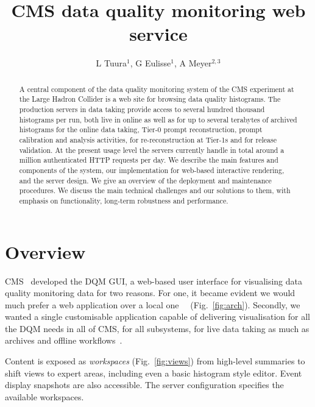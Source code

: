 \documentclass[a4paper]{jpconf}
\begin{document}
\title{CMS data quality monitoring web service}
\author{L Tuura$^1$, G Eulisse$^1$, A Meyer$^{2,3}$}
\address{$^1$ Northeastern University, Boston, MA, USA}
\address{$^2$ DESY, Hamburg, Germany}
\address{$^3$ CERN, Geneva, Switzerland}

\begin{abstract}
A central component of the data quality monitoring system of the CMS
experiment at the Large Hadron Collider is a web site for browsing
data quality histograms.  The production servers in data taking
provide access to several hundred thousand histograms per run, both
live in online as well as for up to several terabytes of archived
histograms for the online data taking, Tier-0 prompt reconstruction,
prompt calibration and analysis activities, for re-reconstruction at
Tier-1s and for release validation.  At the present usage level the
servers currently handle in total around a million authenticated HTTP
requests per day.  We describe the main features and components of the
system, our implementation for web-based interactive rendering, and
the server design.  We give an overview of the deployment and
maintenance procedures.  We discuss the main technical challenges and
our solutions to them, with emphasis on functionality, long-term
robustness and performance.
\end{abstract}


\section{Overview}

CMS~\cite{cms_tp} developed the DQM GUI, a web-based user interface
for visualising data quality monitoring data for two reasons.  For
one, it became evident we would much prefer a web application over a
local one~\cite{dqm_sistrip_07,dqm_ajax_06,cms_webtools_07}~%
(Fig.~\ref{fig:arch}).  Secondly, we wanted a single customisable
application capable of delivering visualisation for all the DQM needs
in all of CMS, for all subsystems, for live data taking as much as
archives and offline workflows~\cite{dqm_overview_09}.

Content is exposed as {\em workspaces} (Fig.~\ref{fig:views}) from
high-level summaries to shift views to expert areas, including even a
basic histogram style editor.  Event display snapshots are also
accessible.  The server configuration specifies the available
workspaces.
\end{document}
